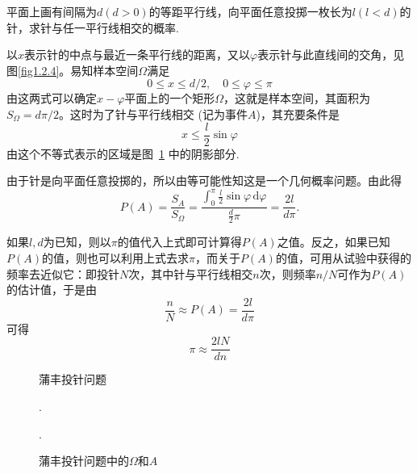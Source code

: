 \begin{example}[蒲丰投针问题]
    平面上画有间隔为$d (d > 0)$的等距平行线，向平面任意投掷一枚长为$l (l<d)$的针，求针与任一平行线相交的概率.
\end{example}
\begin{solution}
    以$x$表示针的中点与最近一条平行线的距离，又以$\varphi$表示针与此直线间的交角，见图\ref{fig1.2.4}。易知样本空间$\Omega$满足
    \[ 0 \le x \le d/2, \quad 0 \le \varphi \le \pi \]
    由这两式可以确定$x - \varphi$平面上的一个矩形$\Omega$，这就是样本空间，其面积为$S_\Omega = d\pi/2$。这时为了针与平行线相交 (记为事件$A$)，其充要条件是
    \[ x \le \frac{l}{2} \sin \varphi \]
    由这个不等式表示的区域是图~\ref{fig1.2.5} 中的阴影部分.

    由于针是向平面任意投掷的，所以由等可能性知这是一个几何概率问题。由此得
    \[
        P(A) = \frac{S_A}{S_\Omega}
        = \frac{\int_0^\pi \frac{l}{2} \sin \varphi \, \mathrm{d} \varphi}{\frac{d}{2} \pi}
        = \frac{2l}{d\pi}.
    \]

    如果$l,d$为已知，则以$\pi$的值代入上式即可计算得$P(A)$之值。反之，如果已知$P(A)$的值，则也可以利用上式去求$\pi$，而关于$P(A)$的值，可用从试验中获得的频率去近似它：即投针$N$次，其中针与平行线相交$n$次，则频率$n/N$可作为$P(A)$的估计值，于是由
    \[ \frac{n}{N} \approx P(A) = \frac{2l}{d\pi} \]
    可得
    \[ \pi \approx \frac{2lN}{dn} \]
\end{solution}

\begin{figure}
    \centering
    \begin{minipage}[b]{0.5\linewidth}
        \centering
        \caption{蒲丰投针问题}.
        \label{fig1.2.4}
    \end{minipage}
    \begin{minipage}[b]{0.5\linewidth}
        \centering
        \caption{蒲丰投针问题中的$\Omega$和$A$}.
        \label{fig1.2.5}
    \end{minipage}
\end{figure}

